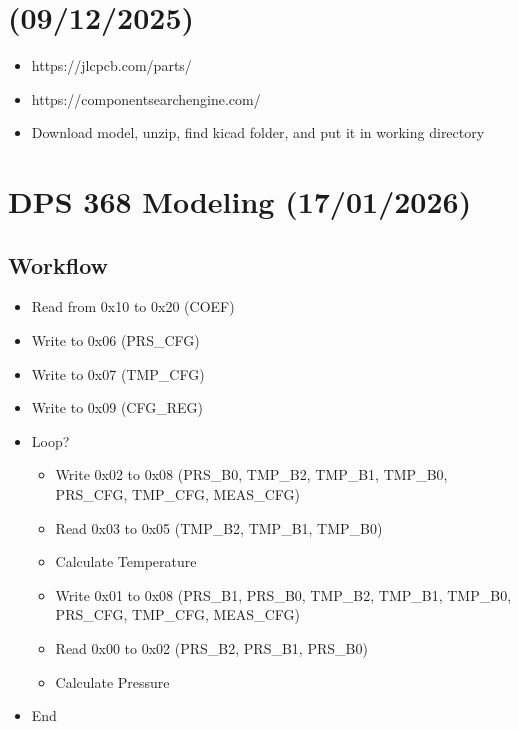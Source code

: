\documentclass{article}
\begin{document}
\section{(09/12/2025)}
\begin{itemize}
    \item https://jlcpcb.com/parts/
    \item https://componentsearchengine.com/
    \item Download model, unzip, find kicad folder, and put it in working directory
\end{itemize}

\section{DPS 368 Modeling (17/01/2026)}
\subsection{Workflow}
\begin{itemize}
    \item Read from 0x10 to 0x20 (COEF)
    \item Write to 0x06 (PRS\_CFG)
    \item Write to 0x07 (TMP\_CFG)
    \item Write to 0x09 (CFG\_REG)
    \item Loop?
    \begin{itemize}
        \item Write 0x02 to 0x08 (PRS\_B0, TMP\_B2, TMP\_B1, TMP\_B0, PRS\_CFG, TMP\_CFG, MEAS\_CFG)
        \item Read 0x03 to 0x05 (TMP\_B2, TMP\_B1, TMP\_B0)
        \item Calculate Temperature
        \item Write 0x01 to 0x08 (PRS\_B1, PRS\_B0, TMP\_B2, TMP\_B1, TMP\_B0, PRS\_CFG, TMP\_CFG, MEAS\_CFG)
        \item Read 0x00 to 0x02 (PRS\_B2, PRS\_B1, PRS\_B0)
        \item Calculate Pressure
    \end{itemize}
    \item End
\end{itemize}
\end{document}
